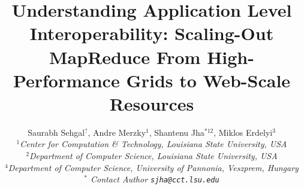 \documentclass[3p,twocolumn]{elsarticle}
\begin{document}
\title{Understanding Application Level Interoperability: Scaling-Out
  MapReduce From High-Performance Grids to Web-Scale Resources}
\author{Saurabh Sehgal$^?$, Andre Merzky$^{1}$, Shantenu Jha$^{*12}$,  Miklos Erdelyi$^3$ \\
\small{\emph{$^{1}$Center for Computation \& Technology, Louisiana State University, USA}}\\
\small{\emph{$^{2}$Department of Computer Science, Louisiana State University, USA}}\\
\small{\emph{$^{4}$Department of Computer Science, University of
    Pannonia, Veszprem, Hungary}}\\
\small{\emph{$^{*}$ Contact Author \texttt{sjha@cct.lsu.edu}}}}

\newif\ifdraft
\drafttrue
\ifdraft
\newcommand{\amnote}[1]{ {\textcolor{magenta} { ***AM: #1c }}}
\newcommand{\jhanote}[1]{ {\textcolor{red} { ***SJ: #1 }}}
\newcommand{\katenote}[1]{ {\textcolor{blue} { ***KS: #1 }}}
\newcommand{\ssnote}[1]{ {\textcolor{blue} { ***SS: #1 }}}
\else
\newcommand{\amnote}[1]{}
\newcommand{\jhanote}[1]{}
\newcommand{\katenote}[1]{}
\newcommand{\ssnote}[1]{}
\fi

\newcommand{\sagamapreduce }{SAGA-MapReduce }
\newcommand{\tc }{ $T_c$ }

\newcommand{\upup}{\vspace*{-0.6em}}
\newcommand{\upp}{\vspace*{-0.6em}}
\newcommand{\up}{\vspace*{-0.3em}}

\newcommand{\T}[1]{\texttt{#1}}
\newcommand{\I}[1]{\textit{#1}}
\newcommand{\B}[1]{\textbf{#1}}

\newcommand{\ssh}[1]{\texttt{ssh}}
\newcommand{\scp}[1]{\texttt{scp}}
\newcommand{\sshfs}[1]{\texttt{sshfs}}
 
\end{document}
